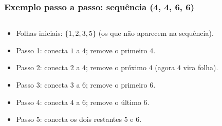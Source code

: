 \documentclass[aspectratio=169]{beamer}
\begin{document}
\begin{frame}[t]
  \frametitle{Exemplo passo a passo: sequência (4, 4, 6, 6)}
  \begin{columns}[T,onlytextwidth]
    \begin{column}{0.62\linewidth}
    \end{column}
    \begin{column}{0.38\linewidth}
    \end{column}
  \end{columns}

  \vspace{6pt}
  \begin{itemize}
    \item<1-> Folhas iniciais: $\{1,2,3,5\}$ (os que não aparecem na sequência).
    \item<2-> Passo 1: conecta $1$ a $4$; remove o primeiro $4$.
    \item<3-> Passo 2: conecta $2$ a $4$; remove o próximo $4$ (agora $4$ vira folha).
    \item<4-> Passo 3: conecta $3$ a $6$; remove o primeiro $6$.
    \item<5-> Passo 4: conecta $4$ a $6$; remove o último $6$.
    \item<6-> Passo 5: conecta os dois restantes $5$ e $6$.
  \end{itemize}
\end{frame}
\end{document}
